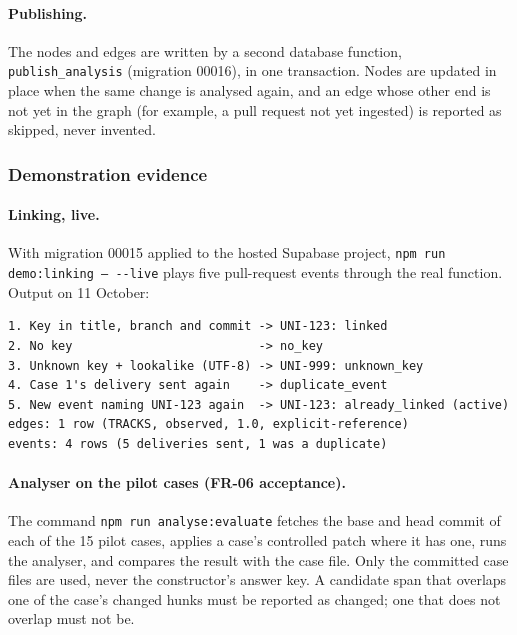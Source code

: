 \paragraph{Publishing.} The nodes and edges are written by a second database
function, \texttt{publish\_\allowbreak{}analysis} (migration 00016), in one transaction.
Nodes are updated in place when the same change is analysed again, and an edge
whose other end is not yet in the graph (for example, a pull request not yet
ingested) is reported as skipped, never invented.

\subsubsection{Demonstration evidence}

\paragraph{Linking, live.} With migration 00015 applied to the hosted Supabase
project, \texttt{npm run demo:\allowbreak{}linking -- -{}-live} plays five
pull-request events through the real function. Output on 11 October:
{\small
\begin{verbatim}
1. Key in title, branch and commit -> UNI-123: linked
2. No key                          -> no_key
3. Unknown key + lookalike (UTF-8) -> UNI-999: unknown_key
4. Case 1's delivery sent again    -> duplicate_event
5. New event naming UNI-123 again  -> UNI-123: already_linked (active)
edges: 1 row (TRACKS, observed, 1.0, explicit-reference)
events: 4 rows (5 deliveries sent, 1 was a duplicate)
\end{verbatim}
}

\paragraph{Analyser on the pilot cases (FR-06 acceptance).}
The command \texttt{npm run analyse:\allowbreak{}evaluate} fetches the base and head commit
of each of the 15 pilot cases, applies a case's controlled patch where it has
one, runs the analyser, and compares the result with the case file. Only the
committed case files are used, never the constructor's answer key. A candidate
span that overlaps one of the case's changed hunks must be reported as
changed; one that does not overlap must not be.


